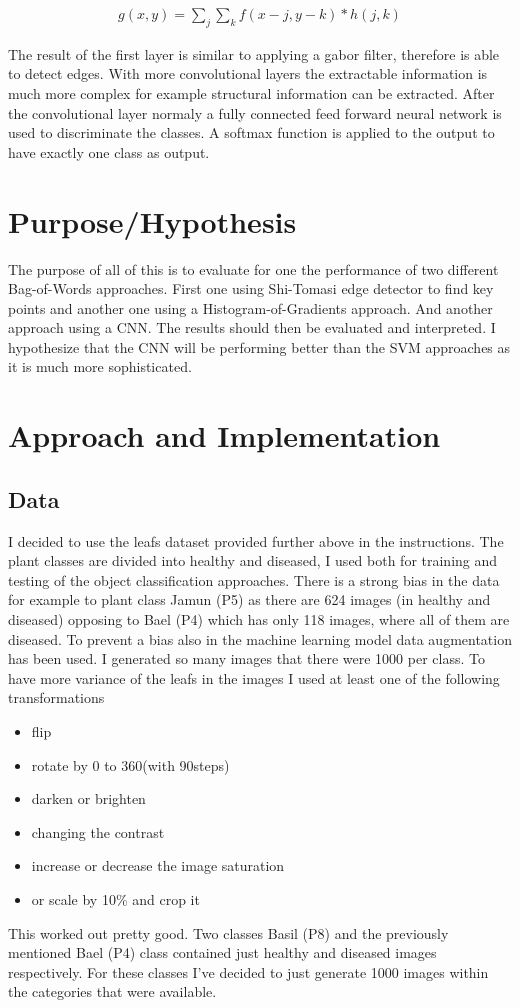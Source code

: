\documentclass[UTF-8]{article}
\begin{document}
\begin{align}\label{conv_eq}
	g(x,y) = \sum_j \sum_k f(x-j, y-k) * h(j, k)
\end{align} 

The result of the first layer is similar to applying a gabor filter, therefore is able to detect edges. With more convolutional layers the extractable information is much more complex for example structural information can be extracted.
After the convolutional layer normaly a fully connected feed forward neural network is used to discriminate the classes. A softmax function is applied to the output to have exactly one class as output. 



\section{Purpose/Hypothesis}
The purpose of all of this is to evaluate for one the performance of two different Bag-of-Words approaches. First one using Shi-Tomasi edge detector to find key points and another one using a Histogram-of-Gradients approach. And another approach using a CNN. The results should then be evaluated and interpreted.
I hypothesize that the CNN will be performing better than the SVM approaches as it is much more sophisticated.





\newpage
\section{Approach and Implementation}
\subsection{Data}
I decided to use the leafs dataset provided further above in the instructions. The plant classes are divided into healthy and diseased, I used both for training and testing of the object classification approaches. There is a strong bias in the data for example to plant class Jamun (P5) as there are 624 images (in healthy and diseased) opposing to Bael (P4) which has only 118 images, where all of them are diseased. To prevent a bias also in the machine learning model data augmentation has been used. I generated so many images that there were 1000 per class. To have more variance of the leafs in the images I used at least one of the following transformations
\begin{itemize}
	\item flip
	\item rotate by 0 to 360\textdegree (with 90\textdegree steps)
	\item darken or brighten
	\item changing the contrast
	\item increase or decrease the image saturation
	\item or scale by 10\% and crop it
\end{itemize}
This worked out pretty good. Two classes Basil (P8) and the previously mentioned Bael (P4) class contained just healthy and diseased images respectively. For these classes I've decided to just generate 1000 images within the categories that were available.
\end{document}

